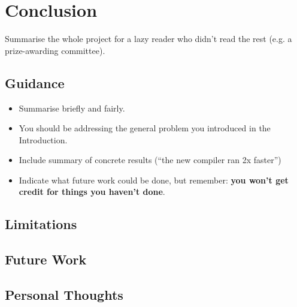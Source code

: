 \documentclass{l4proj}
\theoremstyle{definition}
\begin{document}

\chapter{Conclusion}    
Summarise the whole project for a lazy reader who didn't read the rest (e.g. a prize-awarding committee).
\section{Guidance}
\begin{itemize}
    \item
        Summarise briefly and fairly.
    \item
        You should be addressing the general problem you introduced in the
        Introduction.        
    \item
        Include summary of concrete results (``the new compiler ran 2x
        faster'')
    \item
        Indicate what future work could be done, but remember: \textbf{you
        won't get credit for things you haven't done}.
\end{itemize}

\section{Limitations}
\section{Future Work}
\section{Personal Thoughts}

%
% 
\end{document}
